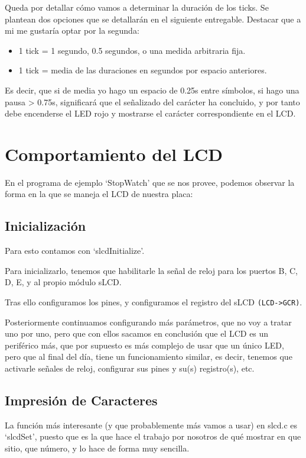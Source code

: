 \documentclass[a4paper,openright,12pt]{article}
\begin{document}
Queda por detallar cómo vamos a determinar la duración de los ticks. Se plantean dos opciones que se detallarán en el siguiente entregable.
Destacar que a mi me gustaría optar por la segunda:

\begin{itemize}
    \item 1 tick = 1 segundo, 0.5 segundos, o una medida arbitraria fija.
    \item 1 tick = media de las duraciones en segundos por espacio anteriores.
\end{itemize}

Es decir, que si de media yo hago un espacio de 0.25s entre símbolos, si hago una pausa > 0.75s, significará que el señalizado del carácter ha concluido, y por tanto debe
encenderse el LED rojo y mostrarse el carácter correspondiente en el LCD.

\section{Comportamiento del LCD}
En el programa de ejemplo `StopWatch' que se nos provee, podemos observar la forma en la que se maneja el LCD de nuestra placa:

\subsection{Inicialización}
Para esto contamos con `slcdInitialize'.

Para inicializarlo, tenemos que habilitarle la señal de reloj para los puertos B, C, D, E, y al propio módulo sLCD.

Tras ello configuramos los pines, y configuramos el registro del sLCD \texttt{(LCD->GCR)}.

Posteriormente continuamos configurando más parámetros, que no voy a tratar uno por uno, pero que con ellos sacamos en conclusión que el LCD es un periférico más, que por
supuesto es más complejo de usar que un único LED, pero que al final del día, tiene un funcionamiento similar, es decir, tenemos que activarle señales de reloj, configurar
sus pines y su(s) registro(s), etc.

\subsection{Impresión de Caracteres}
La función más interesante (y que probablemente más vamos a usar) en slcd.c es `slcdSet', puesto que es la que hace el trabajo por nosotros de qué mostrar en que sitio,
que número, y lo hace de forma muy sencilla.
\end{document}
